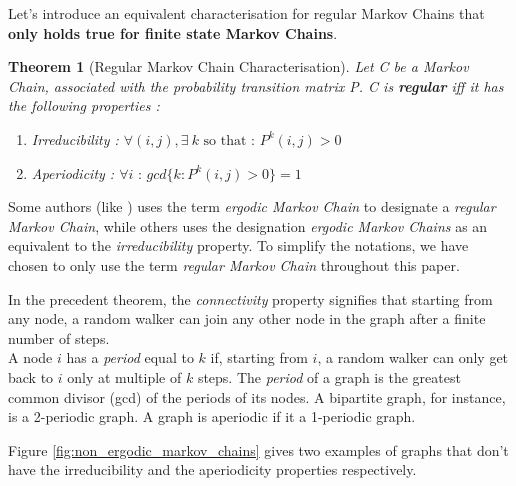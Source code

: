 \documentclass{article}
\newtheorem{theo}{Theorem}[section]
\begin{document}
Let's introduce an equivalent characterisation for regular Markov Chains that \textbf{only holds true for finite state Markov Chains}. 

\begin{theo}[Regular Markov Chain Characterisation]
Let C be a Markov Chain, associated with the probability transition matrix P. C is \textbf{regular} iff it has the following properties :
\begin{enumerate}
    \item Irreducibility : $\forall (i, j), \exists \ k \mbox{ so that : } P^k(i,j)>0$
    \item Aperiodicity : $\forall i \mbox{ : } gcd\{k: P^k(i,j)>0\} = 1$
\end{enumerate}

\end{theo}

\label{ergodic_regular_markov}
Some authors (like \cite{sevi2019}) uses the term \textit{ergodic Markov Chain} to designate a \textit{regular Markov Chain}, while others \cite{grinstead_snell_2006} uses the designation \textit{ergodic Markov Chains} as an equivalent to the \textit{irreducibility} property. To simplify the notations, we have chosen to only use the term \textit{regular Markov Chain} throughout this paper.

In the precedent theorem, the \textit{connectivity} property signifies that starting from any node, a random walker can join any other node in the graph after a finite number of steps. \\
A node $i$ has a \textit{period} equal to $k$ if, starting from $i$, a random walker can only get back to $i$ only at multiple of $k$ steps. The \textit{period} of a graph is the greatest common divisor (gcd) of the periods of its nodes. A bipartite graph, for instance, is a 2-periodic graph. A graph is aperiodic if it a 1-periodic graph.

Figure \ref{fig:non_ergodic_markov_chains} gives two examples of graphs that don't have the irreducibility and the aperiodicity properties respectively.
\end{document}
